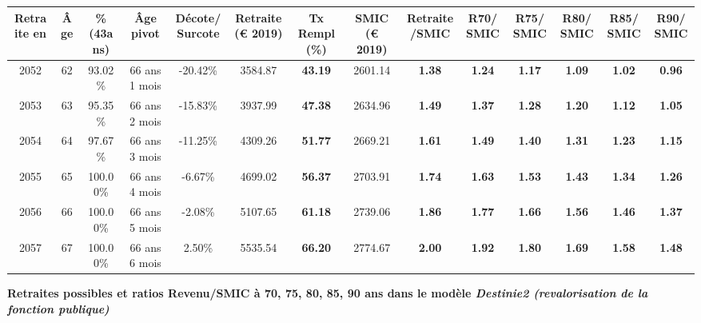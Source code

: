 \begin{adjustbox}{max width=\textwidth} 
\begin{tabular}[htb]{|c|c||c|c|c||c|c||c|c||c|c|c|c|c|} 
\hline 
 Retraite en &  Âge &  \%(43ans) &  Âge pivot &  Décote/Surcote &  Retraite (\euro{} 2019) &  Tx Rempl(\%) &  SMIC (\euro{} 2019) &  Retraite/SMIC &  R70/SMIC &  R75/SMIC &  R80/SMIC &  R85/SMIC &  R90/SMIC \\ 
\hline \hline 
 2052 &  62 &  93.02\% &  66 ans 1 mois &  -20.42\% &  3584.87 &  {\bf 43.19} &  2601.14 &  {\bf 1.38} &  {\bf 1.24} &  {\bf 1.17} &  {\bf 1.09} &  {\bf 1.02} &  {\bf {\color{red} 0.96}} \\ 
\hline 
 2053 &  63 &  95.35\% &  66 ans 2 mois &  -15.83\% &  3937.99 &  {\bf 47.38} &  2634.96 &  {\bf 1.49} &  {\bf 1.37} &  {\bf 1.28} &  {\bf 1.20} &  {\bf 1.12} &  {\bf 1.05} \\ 
\hline 
 2054 &  64 &  97.67\% &  66 ans 3 mois &  -11.25\% &  4309.26 &  {\bf 51.77} &  2669.21 &  {\bf 1.61} &  {\bf 1.49} &  {\bf 1.40} &  {\bf 1.31} &  {\bf 1.23} &  {\bf 1.15} \\ 
\hline 
 2055 &  65 &  100.00\% &  66 ans 4 mois &  -6.67\% &  4699.02 &  {\bf 56.37} &  2703.91 &  {\bf 1.74} &  {\bf 1.63} &  {\bf 1.53} &  {\bf 1.43} &  {\bf 1.34} &  {\bf 1.26} \\ 
\hline 
 2056 &  66 &  100.00\% &  66 ans 5 mois &  -2.08\% &  5107.65 &  {\bf 61.18} &  2739.06 &  {\bf 1.86} &  {\bf 1.77} &  {\bf 1.66} &  {\bf 1.56} &  {\bf 1.46} &  {\bf 1.37} \\ 
\hline 
 2057 &  67 &  100.00\% &  66 ans 6 mois &  2.50\% &  5535.54 &  {\bf 66.20} &  2774.67 &  {\bf 2.00} &  {\bf 1.92} &  {\bf 1.80} &  {\bf 1.69} &  {\bf 1.58} &  {\bf 1.48} \\ 
\hline 
\hline 
\end{tabular} 
\end{adjustbox} 
 
 \vspace{0.1cm} 
{\bf \noindent Retraites possibles et ratios Revenu/SMIC à 70, 75, 80, 85, 90 ans dans le modèle \emph{Destinie2 (revalorisation de la fonction publique)}}  
 
